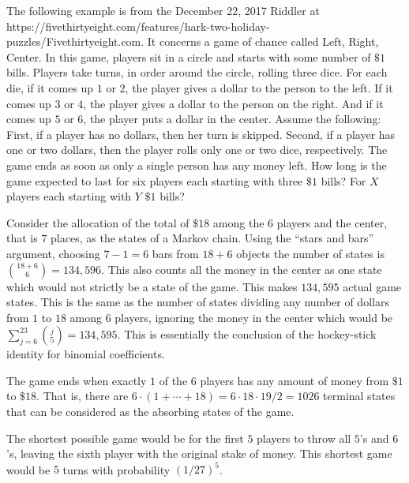 \documentclass[12pt]{article}
\begin{document}
\begin{example}
    The following example is from the December 22, 2017 Riddler at \link
    {https://fivethirtyeight.com/features/hark-two-holiday-puzzles/}{Fivethirtyeight.com}.
    It concerns a game of chance called Left, Right, Center.  In this
    game, players sit in a circle and starts with some number of \( \$1 \)
    bills.  Players take turns, in order around the circle, rolling
    three dice.  For each die, if it comes up \( 1 \) or \( 2 \), the
    player gives a dollar to the person to the left.  If it comes up \(
    3 \) or \( 4 \), the player gives a dollar to the person on the
    right.  And if it comes up \( 5 \) or \( 6 \), the player puts a
    dollar in the center.  Assume the following:  First, if a player has
    no dollars, then her turn is skipped.  Second, if a player has one
    or two dollars, then the player rolls only one or two dice,
    respectively.  The game ends as soon as only a single person has any
    money left.  How long is the game expected to last for six players
    each starting with three \( \$1 \) bills?  For \( X \) players each
    starting with \( Y \) \( \$1 \) bills?

    Consider the allocation of the total of \( \$18 \) among the \( 6 \)
    players and the center, that is \( 7 \) places, as the states of a
    Markov chain.  Using the ``stars and bars'' argument, choosing \(
    7-1 = 6 \) bars from \( 18 + 6 \) objects the number of states is \(
    \binom{18+6}{6} = 134{,}596 \).  This also counts all the money in
    the center as one state which would not strictly be a state of the
    game.  This makes \( 134{,}595 \) actual game states.  This is the
    same as the number of states dividing any number of dollars from \(
    1 \) to \( 18 \) among \( 6 \) players, ignoring the money in the
    center which would be \( \sum_{j=6}^{23}\binom{j}{5} = 134{,}595 \).
    This is essentially the conclusion of the hockey-stick identity for
    binomial coefficients.

    The game ends when exactly \( 1 \) of the \( 6 \) players has any
    amount of money from \( \$1 \) to \( \$18 \).  That is, there are \(
    6 \cdot (1 + \cdots + 18) = 6 \cdot 18 \cdot 19/2 = 1026 \) terminal
    states that can be considered as the absorbing states of the game.

    The shortest possible game would be for the first \( 5 \) players to
    throw all \( 5 \)'s and \( 6 \)'s, leaving the sixth player with the
    original stake of money. This shortest game would be \( 5 \) turns
    with probability \( (1/27)^5 \).


\end{example}
\end{document}
